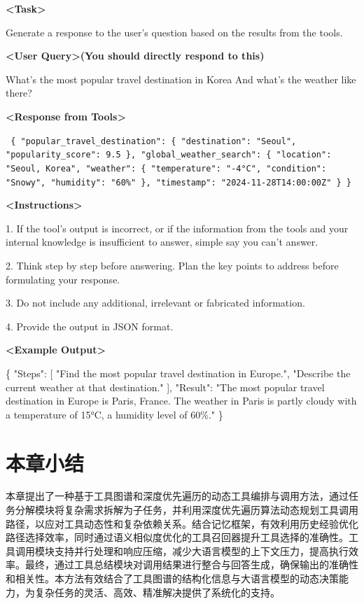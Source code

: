 \begin{center}
\begin{tcolorbox}[colback=bgcolor, colframe=black, width=0.95\textwidth, boxrule=0.5mm, 
coltitle=white, colbacktitle=titlecolor, title=An Example for Response Generation with GPT-4]


\textbf{<Task>} 

Generate a response to the user's question based on the results from the tools.

\textbf{<User Query>(You should directly respond to this)}

What's the most popular travel destination in Korea And what's the weather like there?

\textbf{<Response from Tools>} 

\texttt{%
\{ "popular\_travel\_destination": \{ "destination": "Seoul", "popularity\_score": 9.5 \}, 
  "global\_weather\_search": \{ "location": "Seoul, Korea", 
    "weather": \{ "temperature": "-4°C", "condition": "Snowy", "humidity": "60\%" \}, 
    "timestamp": "2024-11-28T14:00:00Z" \} 
\}%
}

\textbf{<Instructions>}

1. If the tool's output is incorrect, or if the information from the tools and your internal knowledge is insufficient to answer, simple say you can't answer.

2. Think step by step before answering. Plan the key points to address before formulating your response.

3. Do not include any additional, irrelevant or fabricated information.

4. Provide the output in JSON format.

\textbf{<Example Output>}  

\{%
    "Steps": [%
        "Find the most popular travel destination in Europe.",%
        "Describe the current weather at that destination."%
    ],%
    "Result": "The most popular travel destination in Europe is Paris, France. The weather in Paris is partly cloudy with a temperature of 15°C, a humidity level of 60\%."%
\}

\end{tcolorbox}
\end{center}

\section{本章小结}
\label{sec:summary_chap4}

本章提出了一种基于工具图谱和深度优先遍历的动态工具编排与调用方法，通过任务分解模块将复杂需求拆解为子任务，并利用深度优先遍历算法动态规划工具调用路径，以应对工具动态性和复杂依赖关系。结合记忆框架，有效利用历史经验优化路径选择效率，同时通过语义相似度优化的工具召回器提升工具选择的准确性。工具调用模块支持并行处理和响应压缩，减少大语言模型的上下文压力，提高执行效率。最终，通过工具总结模块对调用结果进行整合与回答生成，确保输出的准确性和相关性。本方法有效结合了工具图谱的结构化信息与大语言模型的动态决策能力，为复杂任务的灵活、高效、精准解决提供了系统化的支持。